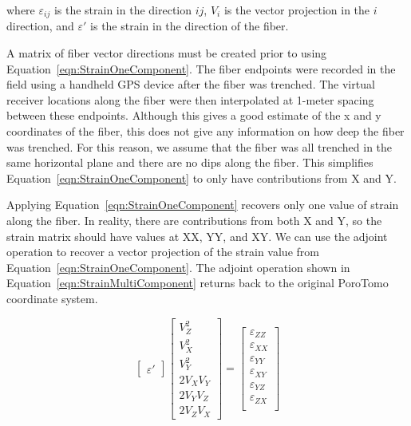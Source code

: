 where $\varepsilon_{ij}$ is the strain in the direction $ij$, $V_{i}$ is the vector projection in the $i$ direction, and $\varepsilon'$ is the strain in the direction of the fiber.

A matrix of fiber vector directions must be created prior to using Equation~\ref{eqn:StrainOneComponent}. The fiber endpoints were recorded in the field using a handheld GPS device after the fiber was trenched. The virtual receiver locations along the fiber were then interpolated at 1-meter spacing between these endpoints. Although this gives a good estimate of the x and y coordinates of the fiber, this does not give any information on how deep the fiber was trenched. For this reason, we assume that the fiber was all trenched in the same horizontal plane and there are no dips along the fiber. This simplifies Equation~\ref{eqn:StrainOneComponent} to only have contributions from X and Y.

Applying Equation~\ref{eqn:StrainOneComponent} recovers only one value of strain along the fiber. In reality, there are contributions from both X and Y, so the strain matrix should have values at XX, YY, and XY. We can use the adjoint operation to recover a vector projection of the strain value from Equation~\ref{eqn:StrainOneComponent}. The adjoint operation shown in Equation~\ref{eqn:StrainMultiComponent} returns back to the original PoroTomo coordinate system.

\begin{equation}
  \begin{bmatrix}
    \varepsilon'
  \end{bmatrix}
\begin{bmatrix}
  V_Z^2 \\ V_X^2 \\ V_Y^2 \\ 2V_XV_Y \\ 2V_YV_Z \\2V_ZV_X
\end{bmatrix}
=
\begin{bmatrix}
  \varepsilon_{ZZ} \\
  \varepsilon_{XX} \\
  \varepsilon_{YY} \\
  \varepsilon_{XY} \\
  \varepsilon_{YZ} \\
  \varepsilon_{ZX} \\
\end{bmatrix}
\label{eqn:StrainMultiComponent}
\end{equation}


